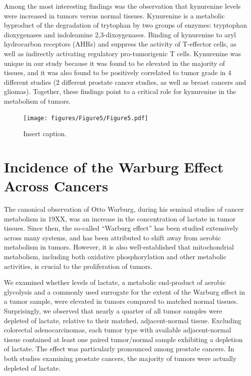 \documentclass[10pt]{article}
\begin{document}
Among the most interesting findings was the observation that kynurenine levels were increased in tumors versus normal tissues. Kynurenine is a metabolic byproduct of the degradation of trytophan by two groups of enzymes: tryptophan dioxygenases and indoleamine 2,3-dixoygenases. Binding of kynurenine to aryl hydrocarbon receptors (AHRs) and suppress the activity of T-effector cells, as well as indirectly activating regulatory pro-tumorigenic T cells. Kynurenine was unique in our study because it was found to be elevated in the majority of tissues, and it was also found to be positively correlated to tumor grade in 4 different studies (2 different prostate cancer studies, as well as breast cancers and gliomas). Together, these findings point to a critical role for kynurenine in the metabolism of tumors.

\begin{figure}[ht!]
  \centering
     \texttt{[image: figures/Figure5/Figure5.pdf]}
  \caption{Insert caption. }
     \label{fig:Fig5}
\end{figure}

\section{Incidence of the Warburg Effect Across Cancers }
The canonical observation of Otto Warburg, during his seminal studies of cancer metabolism in 19XX, was an increase in the concentration of lactate in tumor tissues. Since then, the so-called ``Warburg effect'' has been studied extensively across many systems, and has been attributed to shift away from aerobic metabolism in tumors. However, it is also well-established that mitochondrial metabolism, including both oxidative phosphorylation and other metabolic activities, is crucial to the proliferation of tumors.

We examined whether levels of lactate, a metabolic end-product of aerobic glycolysis and a commonly used surrogate for the extent of the Warburg effect in a tumor sample, were elevated in tumors compared to matched normal tissues. Surprisingly, we observed that nearly a quarter of all tumor samples were depleted of lactate, relative to their matched, adjacent-normal tissue. Excluding colorectal adenocarcinomas, each tumor type with available adjacent-normal tissue contained at least one paired tumor/normal sample exhibiting a depletion of lactate. The effect was particularly pronounced among prostate cancers. In both studies examining prostate cancers, the majority of tumors were actually depleted of lactate.
\end{document}
